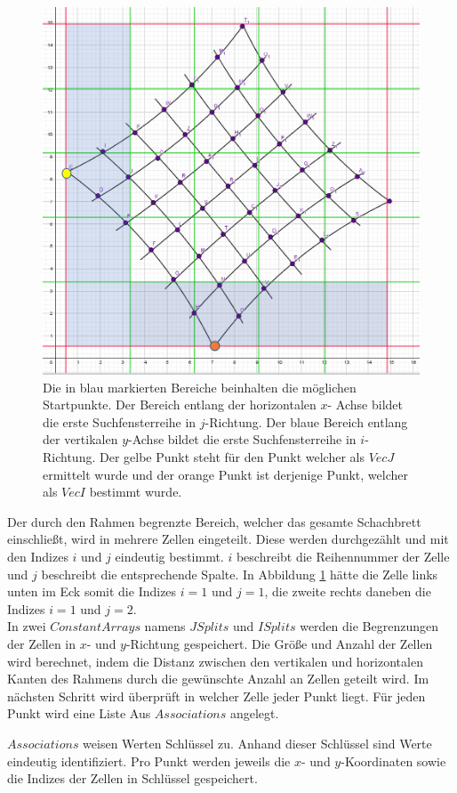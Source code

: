 \begin{figure}[!htb]
	\centering
	\includegraphics[width=0.6\linewidth]{images/VerzeichnetesSchachbrett_1.png}
	\caption[Startpunktsuche in Schachbretteckpunkten]{Die in blau markierten Bereiche beinhalten die möglichen Startpunkte. Der Bereich entlang der horizontalen $x$- Achse bildet die erste Suchfensterreihe in $j$-Richtung. Der blaue Bereich entlang der vertikalen $y$-Achse bildet die erste Suchfensterreihe in $i$-Richtung. Der gelbe Punkt steht für den Punkt welcher als $VecJ$ ermittelt wurde und der orange Punkt ist derjenige Punkt, welcher als $VecI$ bestimmt wurde.}
	\label{fig:7.1}
\end{figure}

Der durch den Rahmen begrenzte Bereich, welcher das gesamte Schachbrett einschließt, wird in mehrere Zellen eingeteilt. Diese werden durchgezählt und mit den Indizes $i$ und $j$ eindeutig bestimmt. $i$ beschreibt die Reihennummer der Zelle und $j$ beschreibt die entsprechende Spalte. In Abbildung \ref{fig:7.1} hätte die Zelle links unten im Eck somit die Indizes $i = 1$ und $j = 1$, die zweite rechts daneben die Indizes $i = 1$ und $j= 2$.\\

In zwei $ConstantArrays$ namens $JSplits$ und $ISplits$ werden die Begrenzungen der Zellen  in $x$- und $y$-Richtung gespeichert. Die Größe und Anzahl der Zellen wird berechnet, indem die Distanz zwischen den vertikalen und horizontalen Kanten des Rahmens durch die gewünschte Anzahl an Zellen geteilt wird. Im nächsten Schritt wird überprüft in welcher Zelle jeder Punkt liegt. Für jeden Punkt wird eine Liste Aus $Associations$ angelegt. 
\pagebreak

$Associations$ weisen Werten Schlüssel zu. Anhand dieser Schlüssel sind Werte eindeutig identifiziert\cite{Mathematica}. Pro Punkt werden jeweils die $x$- und $y$-Koordinaten sowie die Indizes der Zellen in Schlüssel gespeichert.

